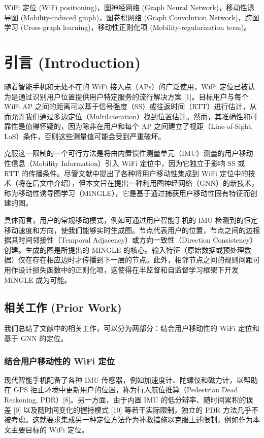 \documentclass[journal]{IEEEtran}
\begin{document}
\begin{IEEEkeywords}
WiFi 定位 (WiFi positioning)，图神经网络 (Graph Neural Network)，移动性诱导图 (Mobility-induced graph)，图卷积网络 (Graph Convolution Network)，跨图学习 (Cross-graph learning)，移动性正则化项 (Mobility-regularization term)。
\end{IEEEkeywords}

\section{引言 (Introduction)}

随着智能手机和无处不在的 WiFi 接入点（APs）的广泛使用，WiFi 定位已被认为是通过识别用户位置提供用户特定服务的流行解决方案 [1]。目标用户与每个 WiFi AP 之间的距离可以基于信号强度（SS）或往返时间（RTT）进行估计，从而允许我们通过多边定位（Multilateration）找到位置估计。然而，其准确性和可靠性是值得怀疑的，因为除非在用户和每个 AP 之间建立了视距（Line-of-Sight, LoS）条件，否则这些测量值可能会受到严重破坏。

克服这一限制的一个可行方法是将由内置惯性测量单元（IMU）测量的用户移动性信息（Mobility Information）引入 WiFi 定位中，因为它独立于影响 SS 或 RTT 的传播条件。尽管文献中提出了各种将用户移动性集成到 WiFi 定位中的技术（将在后文中介绍），但本文旨在提出一种利用图神经网络（GNN）的新技术，称为移动性诱导图学习（MINGLE），它是基于通过捕获用户移动性固有特征而创建的图。

具体而言，用户的常规移动模式，例如可通过用户智能手机的 IMU 检测到的恒定移动速度和方向，使我们能够实时生成图。节点代表用户的位置，节点之间的边根据其时间邻接性（Temporal Adjacency）或方向一致性（Direction Consistency）创建。生成的图是所提出的 MINGLE 的核心。输入特征（原始数据或预处理数据）仅在存在相应边时才传播到下一层的节点。此外，相邻节点之间的规则间距可用作设计损失函数中的正则化项，这使得在半监督和自监督学习框架下开发 MINGLE 成为可能。

\subsection{相关工作 (Prior Work)}
我们总结了文献中的相关工作，可以分为两部分：结合用户移动性的 WiFi 定位和基于 GNN 的定位。

\subsubsection{结合用户移动性的 WiFi 定位}
现代智能手机配备了各种 IMU 传感器，例如加速度计、陀螺仪和磁力计，以帮助在 GPS 拒止环境中更新用户的位置，称为行人航位推算（Pedestrian Dead Reckoning, PDR）[8]。另一方面，由于内置 IMU 的低分辨率、随时间累积的误差 [9] 以及随时间变化的握持模式 [10] 等若干实际限制，独立的 PDR 方法几乎不被考虑。这就要求集成另一种定位方法作为补救措施以克服上述限制，例如作为本文主要目标的 WiFi 定位。
\end{document}
